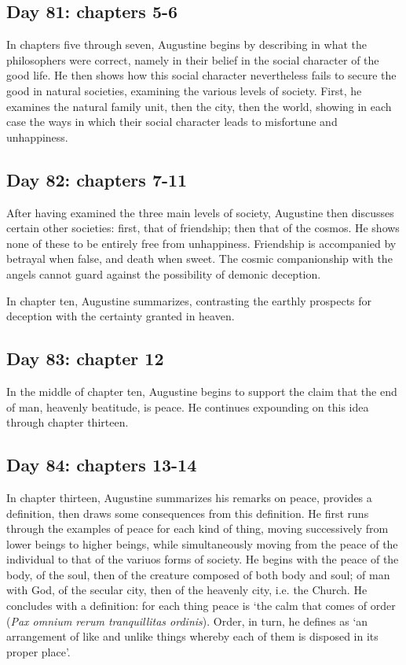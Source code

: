 \subsection{Day 81: chapters 5-6}
In chapters five through seven, Augustine begins by describing in what the philosophers were correct, namely in their belief in the social character of the good life. He then shows how this social character nevertheless fails to secure the good in natural societies, examining the various levels of society. First, he examines the natural family unit, then the city, then the world, showing in each case the ways in which their social character leads to misfortune and unhappiness.
\subsection{Day 82: chapters 7-11}
After having examined the three main levels of society, Augustine then discusses certain other societies: first, that of friendship; then that of the cosmos. He shows none of these to be entirely free from unhappiness. Friendship is accompanied by betrayal when false, and death when sweet. The cosmic companionship with the angels cannot guard against the possibility of demonic deception. 

In chapter ten, Augustine summarizes, contrasting the earthly prospects for deception with the certainty granted in heaven.
\subsection{Day 83: chapter 12}
In the middle of chapter ten, Augustine begins to support the claim that the end of man, heavenly beatitude, is peace. He continues expounding on this idea through chapter thirteen.
\subsection{Day 84: chapters 13-14}


In chapter thirteen, Augustine summarizes his remarks on peace, provides a definition, then draws some consequences from this definition. He first runs through the examples of peace for each kind of thing, moving successively from lower beings to higher beings, while simultaneously moving from the peace of the individual to that of the variuos forms of society. He begins with the peace of the body, of the soul, then of the creature composed of both body and soul; of man with God, of the secular city, then of the heavenly city, i.e. the Church. He concludes with a definition: for each thing peace is `the calm that comes of order (\textit{Pax omnium rerum tranquillitas ordinis}). Order, in turn, he defines as `an arrangement of like and unlike things whereby each of them is disposed in its proper place'.

